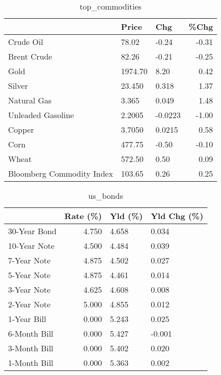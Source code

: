 \documentclass{article}%
\begin{document}
\begin{table}[htbp]%
\caption{top\_commodities}%
\centering%
\begin{adjustbox}{width=1\textwidth}%
\begin{tabular}{lllr}
\toprule
                          &   Price &     Chg &  \%Chg \\
\midrule
               Crude Oil  &   78.02 &   -0.24 & -0.31 \\
             Brent Crude  &   82.26 &   -0.21 & -0.25 \\
                    Gold  & 1974.70 &    8.20 &  0.42 \\
                  Silver  &  23.450 &   0.318 &  1.37 \\
             Natural Gas  &   3.365 &   0.049 &  1.48 \\
       Unleaded Gasoline  &  2.2005 & -0.0223 & -1.00 \\
                  Copper  &  3.7050 &  0.0215 &  0.58 \\
                    Corn  &  477.75 &   -0.50 & -0.10 \\
                   Wheat  &  572.50 &    0.50 &  0.09 \\
Bloomberg Commodity Index &  103.65 &    0.26 &  0.25 \\
\bottomrule
\end{tabular}
%
\end{adjustbox}%
\end{table}

%


\begin{table}[htbp]%
\caption{us\_bonds}%
\centering%
\begin{adjustbox}{width=1\textwidth}%
\begin{tabular}{lrll}
\toprule
             &  Rate (\%) & Yld (\%) & Yld Chg (\%) \\
\midrule
30-Year Bond &     4.750 &   4.658 &       0.034 \\
10-Year Note &     4.500 &   4.484 &       0.039 \\
 7-Year Note &     4.875 &   4.502 &       0.027 \\
 5-Year Note &     4.875 &   4.461 &       0.014 \\
 3-Year Note &     4.625 &   4.608 &       0.008 \\
 2-Year Note &     5.000 &   4.855 &       0.012 \\
 1-Year Bill &     0.000 &   5.243 &       0.025 \\
6-Month Bill &     0.000 &   5.427 &      -0.001 \\
3-Month Bill &     0.000 &   5.402 &       0.020 \\
1-Month Bill &     0.000 &   5.363 &       0.002 \\
\bottomrule
\end{tabular}
%
\end{adjustbox}%
\end{table}
\end{document}
